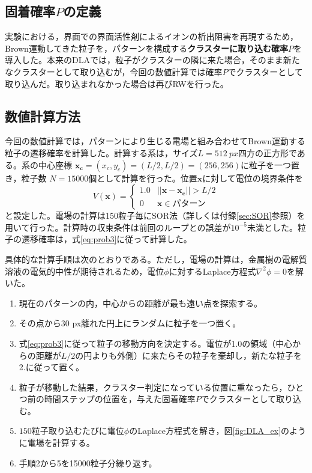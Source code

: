 \documentclass[autodetect-engine,dvi=dvipdfmx,a4paper,ja=standard,oneside,openany,11pt]{bxjsbook}
\begin{document}
\subsection{固着確率$P$の定義}
実験における，界面での界面活性剤によるイオンの析出阻害を再現するため，Brown運動してきた粒子を，パターンを構成する\textbf{クラスターに取り込む確率$P$}を導入した。本来のDLAでは，粒子がクラスターの隣に来た場合，そのまま新たなクラスターとして取り込むが，今回の数値計算では確率$P$でクラスターとして取り込んだ。取り込まれなかった場合は再びRWを行った。
\subsection{数値計算方法}
今回の数値計算では，パターンにより生じる電場と組み合わせてBrown運動する粒子の遷移確率を計算した。計算する系は，サイズ$L=\SI{512}{px}$四方の正方形である。系の中心座標 $\bm{x_c}=(x_c,y_c)=(L/2,L/2)=(256,256)$に粒子を一つ置き，粒子数 $N=15000$個として計算を行った。位置$\bm{x}$に対して電位の境界条件を
\begin{equation}
  V(\bm{x})=
  \begin{cases}
    1.0 & ||\bm{x}-\bm{x_c}||>L/2 \\
    0   & \bm{x}\in\text{パターン}
  \end{cases}
  \label{eq:boundary_sim}
\end{equation}
と設定した。電場の計算は150粒子毎にSOR法（詳しくは付録\ref{sec:SOR}参照）を用いて行った。計算時の収束条件は前回のループとの誤差が$10^{-5}$未満とした。粒子の遷移確率は，式\eqref{eq:prob3}に従って計算した。

具体的な計算手順は次のとおりである。ただし，電場の計算は，金属樹の電解質溶液の電気的中性が期待されるため，電位$\phi$に対するLaplace方程式$\nabla^2\phi=0$を解いた。
\begin{samepage}
  \begin{enumerate}
    \item 現在のパターンの内，中心からの距離が最も遠い点を探索する。
    \item その点から30 px離れた円上にランダムに粒子を一つ置く。
    \item 式\eqref{eq:prob3}に従って粒子の移動方向を決定する。電位が1.0の領域（中心からの距離が$L/2$の円よりも外側）に来たらその粒子を棄却し，新たな粒子を2.に従って置く。
    \item 粒子が移動した結果，クラスター判定になっている位置に重なったら，ひとつ前の時間ステップの位置を，与えた固着確率$P$でクラスターとして取り込む。
    \item $150$粒子取り込むたびに電位$\phi$のLaplace方程式を解き，図\ref{fig:DLA_ex}のように電場を計算する。
    \item 手順2から5を15000粒子分繰り返す。
  \end{enumerate}
\end{samepage}
\end{document}
